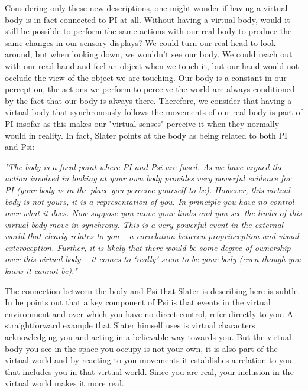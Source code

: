 Considering only these new descriptions, one might wonder if having a virtual body is in fact connected to PI at all. Without having a virtual body, would it still be possible to perform the same actions with our real body to produce the same changes in our sensory displays? We could turn our real head to look around, but when looking down, we wouldn't see our body. We could reach out with our read hand and feel an object when we touch it, but our hand would not occlude the view of the object we are touching. Our body is a constant in our perception, the actions we perform to perceive the world are always conditioned by the fact that our body is always there. Therefore, we consider that having a virtual body that synchronously follows the movements of our real body is part of PI insofar as this makes our "virtual senses" perceive it when they normally would in reality. In fact, Slater points at the body as being related to both PI and Psi:

\begin{displayquote}
\textit{"The body is a focal point where PI and Psi are fused. As we have argued the action involved in looking at your own body provides very powerful evidence for PI (your body is in the place you perceive yourself to be). However, this virtual body is not yours, it is a representation of you. In principle you have no control over what it does. Now suppose you move your limbs and you see the limbs of this virtual body move in synchrony. This is a very powerful event in the external world that clearly relates to you – a correlation between proprioception and visual exteroception. Further, it is likely that there would be some degree of ownership over this virtual body – it comes to ‘really’ seem to be your body (even though you know it cannot be)."} \parencite{Slater2009}
\end{displayquote}

The connection between the body and Psi that Slater is describing here is subtle. In \parencite{Slater2009} he points out that a key component of Psi is that events in the virtual environment and over which you have no direct control, refer directly to you. A straightforward example that Slater himself uses is virtual characters acknowledging you and acting in a believable way towards you. But the virtual body you see in the space you occupy is not your own, it is also part of the virtual world and by reacting to you movements it establishes a relation to you that includes you in that virtual world. Since you are real, your inclusion in the virtual world makes it more real.

